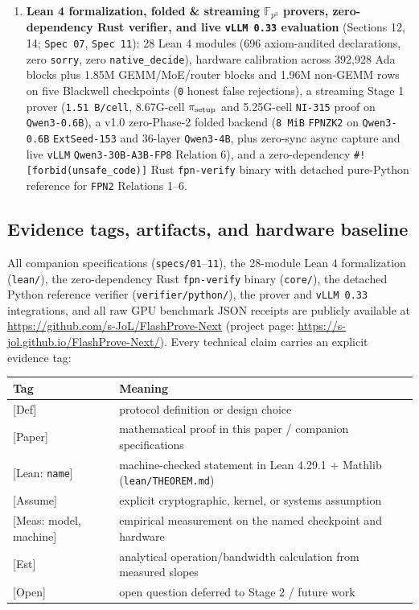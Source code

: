\documentclass[10pt]{article}
\begin{document}
\begin{enumerate}
\item{} \textbf{Lean 4 formalization, folded \& streaming $\mathbb F_{p^3}$ provers, zero-dependency Rust verifier, and live \texttt{vLLM 0.\allowbreak{}33} evaluation} (Sections 12, 14; \texttt{Spec 07}, \texttt{Spec 11}): 28 Lean 4 modules (696 axiom-audited declarations, zero \texttt{sorry}, zero \texttt{native\_\allowbreak{}decide}), hardware calibration across 392,928 Ada blocks plus 1.85M GEMM/MoE/router blocks and 1.96M non-GEMM rows on five Blackwell checkpoints (\texttt{0} honest false rejections), a streaming Stage 1 prover (\texttt{1.\allowbreak{}51 B/cell}, 8.67G-cell $\pi_{\rm setup}$ and 5.25G-cell \texttt{NI-315} proof on \texttt{Qwen3-0.\allowbreak{}6B}), a v1.0 zero-Phase-2 folded backend (\texttt{8 MiB} \texttt{FPNZK2} on \texttt{Qwen3-0.\allowbreak{}6B} \texttt{ExtSeed-153} and 36-layer \texttt{Qwen3-4B}, plus zero-sync async capture and live \texttt{vLLM} \texttt{Qwen3-30B-A3B-FP8} Relation 6), and a zero-dependency \texttt{\#![forbid(unsafe\_\allowbreak{}code)]} Rust \texttt{fpn-verify} binary with detached pure-Python reference for \texttt{FPN2} Relations 1--6.
\end{enumerate}

\subsection{Evidence tags, artifacts, and hardware baseline}
All companion specifications (\texttt{specs/01}--\texttt{11}), the 28-module Lean 4 formalization (\texttt{lean/}), the zero-dependency Rust \texttt{fpn-verify} binary (\texttt{core/}), the detached Python reference verifier (\texttt{verifier/python/}), the prover and \texttt{vLLM 0.\allowbreak{}33} integrations, and all raw GPU benchmark JSON receipts are publicly available at \url{https://github.com/s-JoL/FlashProve-Next} (project page: \url{https://s-jol.github.io/FlashProve-Next/}). Every technical claim carries an explicit evidence tag:

\begin{center}\small
\begin{tabularx}{\linewidth}{>{\hsize}Y>{\hsize}Y}
\toprule
{}\textbf{Tag} & {}\textbf{Meaning} \\
\midrule
{}[Def] & {}protocol definition or design choice \\
{}[Paper] & {}mathematical proof in this paper / companion specifications \\
{}[Lean: \texttt{name}] & {}machine-checked statement in Lean 4.29.1 + Mathlib (\texttt{lean/THEOREM.\allowbreak{}md}) \\
{}[Assume] & {}explicit cryptographic, kernel, or systems assumption \\
{}[Meas: model, machine] & {}empirical measurement on the named checkpoint and hardware \\
{}[Est] & {}analytical operation/bandwidth calculation from measured slopes \\
{}[Open] & {}open question deferred to Stage 2 / future work \\
\bottomrule
\end{tabularx}
\end{center}
\end{document}
